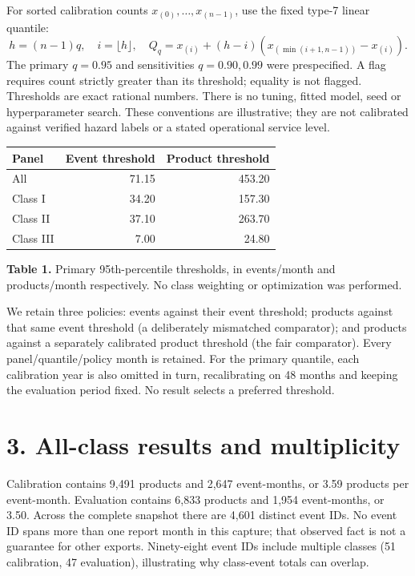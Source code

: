 \documentclass[10pt,letterpaper]{article}
\begin{document}
For sorted calibration counts $x_{(0)},\ldots,x_{(n-1)}$, use the fixed type-7 linear quantile:
\[
h=(n-1)q,\quad i=\lfloor h\rfloor,\quad
Q_q=x_{(i)}+(h-i)(x_{(\min(i+1,n-1))}-x_{(i)}).
\]
The primary $q=0.95$ and sensitivities $q=0.90,0.99$ were prespecified. A flag requires count strictly greater than its threshold; equality is not flagged. Thresholds are exact rational numbers. There is no tuning, fitted model, seed or hyperparameter search. These conventions are illustrative; they are not calibrated against verified hazard labels or a stated operational service level.

\begin{center}\begin{tabular}{lrr}\toprule
Panel & Event threshold & Product threshold\\\midrule
All & 71.15 & 453.20 \\
Class I & 34.20 & 157.30 \\
Class II & 37.10 & 263.70 \\
Class III & 7.00 & 24.80 \\
\bottomrule\end{tabular}\end{center}
\textbf{Table 1.} Primary 95th-percentile thresholds, in events/month and products/month respectively. No class weighting or optimization was performed.

We retain three policies: events against their event threshold; products against that same event threshold (a deliberately mismatched comparator); and products against a separately calibrated product threshold (the fair comparator). Every panel/quantile/policy month is retained. For the primary quantile, each calibration year is also omitted in turn, recalibrating on 48 months and keeping the evaluation period fixed. No result selects a preferred threshold.

\clearpage
\section*{3. All-class results and multiplicity}
Calibration contains 9,491 products and 2,647 event-months, or 3.59 products per event-month. Evaluation contains 6,833 products and 1,954 event-months, or 3.50. Across the complete snapshot there are 4,601 distinct event IDs. No event ID spans more than one report month in this capture; that observed fact is not a guarantee for other exports. Ninety-eight event IDs include multiple classes (51 calibration, 47 evaluation), illustrating why class-event totals can overlap.
\end{document}
